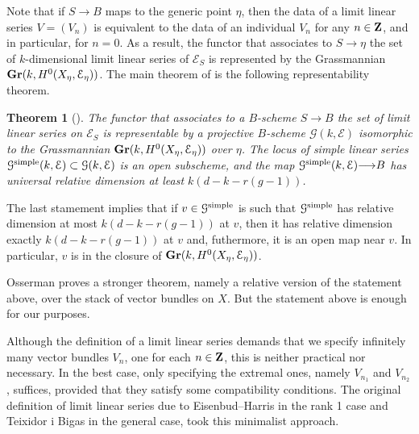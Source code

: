 \documentclass[11pt,reqno]{amsart}
\theoremstyle{plain}
\newtheorem{theorem}{Theorem}[section]
\theoremstyle{definition}
\theoremstyle{remark}
\numberwithin{equation}{section}
\renewcommand{\to}{{\longrightarrow}}
\numberwithin{equation}{section}
\begin{document}
Note that if $S \to B$ maps to the generic point $\eta$, then the data of a limit linear series $V = (V_n)$ is equivalent to the data of an individual $V_n$ for any $n \in {\bf Z}$, and in particular, for $n = 0$.
As a result, the functor that associates to $S \to \eta$ the set of $k$-dimensional limit linear series of $\mathcal E_S$ is represented by the Grassmannian ${\bf Gr}(k, H^0(X_\eta, \mathcal E_\eta))$.
The main theorem of \cite{oss:14} is the following representability theorem.
\begin{theorem}[{\cite[Theorem~3.4.7]{oss:14}}]
  \label{thm:lls}
  The functor that associates to a $B$-scheme $S \to B$ the set of limit linear series on $\mathcal E_S$ is representable by a projective $B$-scheme $\mathcal G(k, \mathcal E)$ isomorphic to the Grassmannian ${\bf Gr}(k, H^0(X_\eta, \mathcal E_\eta))$ over $\eta$.
  The locus of simple linear series ${\mathcal G}^{\rm simple}(k, \mathcal E) \subset {\mathcal G}(k, \mathcal E)$ is an open subscheme, and the map ${\mathcal G}^{\rm simple}(k, \mathcal E) \to B$ has universal relative dimension at least $k(d-k-r(g-1))$.
\end{theorem}
The last stamement implies that if $v \in {\mathcal G}^{\rm simple}$ is such that ${\mathcal G}^{\rm simple}$ has relative dimension at most $k(d-k-r(g-1))$ at $v$, then it has relative dimension exactly $k(d-k-r(g-1))$ at $v$ and, futhermore, it is an open map near $v$.
In particular, $v$ is in the closure of ${\bf Gr}(k, H^0(X_\eta, \mathcal E_\eta))$.
\begin{remark}
  Osserman proves a stronger theorem, namely a relative version of the statement above, over the stack of vector bundles on $X$.
  But the statement above is enough for our purposes.  
\end{remark}

Although the definition of a limit linear series demands that we specify infinitely many vector bundles $V_n$, one for each $n \in {\bf Z}$, this is neither practical nor necessary.
In the best case, only specifying the extremal ones, namely $V_{n_1}$ and $V_{n_2}$, suffices, provided that they satisfy some compatibility conditions.
The original definition of limit linear series due to Eisenbud--Harris \cite{eis.har:86,eis.har:84} in the rank 1 case and Teixidor i Bigas \cite{tei-i-big:91} in the general case, took this minimalist approach.
\end{document}
